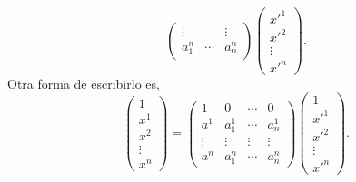 \begin{observation}
\[\begin{pmatrix}
\vdots & & \vdots \\
a^{n}_{1} & \cdots & a^{n}_{n}\end{pmatrix}\begin{pmatrix} x'^{1} \\ x'^{2} \\ \vdots \\ x'^{n} \end{pmatrix} .\]
Otra forma de escribirlo es,
\[ \begin{pmatrix} 1 \\ x^{1} \\ x^{2} \\ \vdots \\ x^{n} \end{pmatrix} =  \begin{pmatrix} 1 & 0 & \cdots & 0 \\a^{1} & a^{1}_{1}  & \cdots & a^{1}_{n} \\
\vdots & \vdots & \vdots & \vdots \\
a^{n} & a^{n}_{1} & \cdots & a^{n}_{n}\end{pmatrix}\begin{pmatrix} 1 \\ x'^{1} \\ x'^{2} \\ \vdots \\ x'^{n} \end{pmatrix}.\]
\end{observation}
